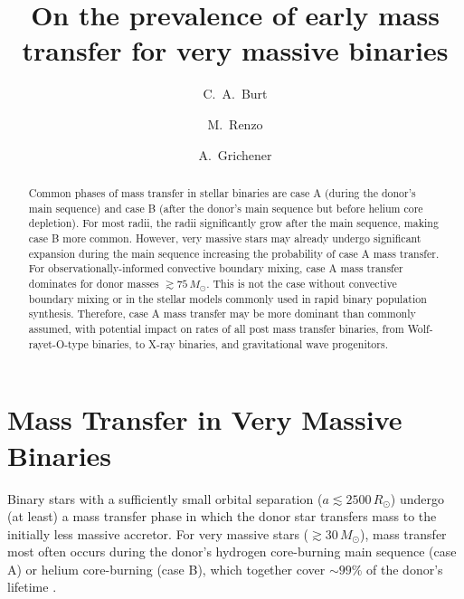 \documentclass[twocolumn]{aastex63}
\begin{document}
\title{On the prevalence of early mass transfer for very massive binaries}

\author[0009-0008-2061-4946]{C.~A.~Burt}

\author[0000-0002-6718-9472]{M.~Renzo}

\author[0000-0002-2215-1841]{A.~Grichener}

\begin{abstract}
  Common phases of mass transfer in stellar binaries are case A
  (during the donor's main sequence) and case B (after the donor's
  main sequence but before helium core depletion). For most radii, the
  radii significantly grow after the main sequence, making case B more
  common. However, very massive stars may already undergo significant
  expansion during the main sequence increasing the probability of
  case A mass transfer.  For observationally-informed convective
  boundary mixing, case A mass transfer dominates for donor masses
  $\gtrsim 75 \, M_{\odot}$. This is not the case without convective
  boundary mixing or in the stellar models commonly used in rapid
  binary population synthesis.  Therefore, case A mass transfer may be
  more dominant than commonly assumed, with potential impact on rates
  of all post mass transfer binaries, from Wolf-rayet-O-type binaries,
  to X-ray binaries, and gravitational wave progenitors.
\end{abstract}

\section{Mass Transfer in Very Massive Binaries}

Binary stars with a sufficiently small orbital separation
($a\lesssim2500\,R_{\odot}$) undergo (at least) a mass transfer phase
in which the donor star transfers mass to the initially less massive
accretor. For very massive stars ($ \gtrsim 30 \, M_{\odot}$), mass
transfer most often occurs during the donor's hydrogen core-burning
main sequence (case A) or helium core-burning (case B), which together cover
$\sim99\%$ of the donor's lifetime \citep{kippenhahn:67}.
\end{document}

